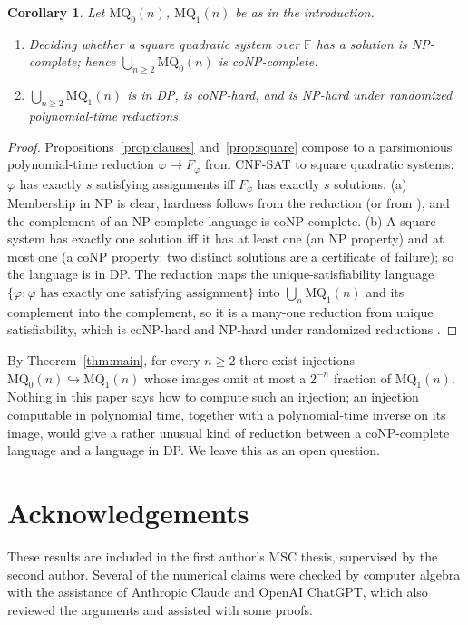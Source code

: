 \documentclass[11pt,a4paper]{article}
\newtheorem{corollary}[theorem]{Corollary}
\theoremstyle{definition}
\newcommand{\MQ}{\mathrm{MQ}}
\newcommand{\FF}{\mathbb{F}}
\begin{document}
\begin{corollary}\label{cor:complexity}
Let $\MQ_0(n)$, $\MQ_1(n)$ be as in the introduction.
\begin{enumerate}[label=\textnormal{(\alph*)}]
\item Deciding whether a square quadratic system over $\FF$ has a solution is NP-complete; hence $\bigcup_{n\ge2}\MQ_0(n)$ is coNP-complete.
\item $\bigcup_{n\ge2}\MQ_1(n)$ is in DP, is coNP-hard, and is NP-hard under randomized polynomial-time reductions.
\end{enumerate}
\end{corollary}

\begin{proof}
Propositions~\ref{prop:clauses} and~\ref{prop:square} compose to a parsimonious polynomial-time reduction $\varphi\mapsto F_\varphi$ from CNF-SAT to square quadratic systems: $\varphi$ has exactly $s$ satisfying assignments iff $F_\varphi$ has exactly $s$ solutions. (a) Membership in NP is clear, hardness follows from the reduction (or from \cite{fraenkelyesha}), and the complement of an NP-complete language is coNP-complete. (b) A square system has exactly one solution iff it has at least one (an NP property) and at most one (a coNP property: two distinct solutions are a certificate of failure); so the language is in DP. The reduction maps the unique-satisfiability language $\{\varphi:\varphi\text{ has exactly one satisfying assignment}\}$ into $\bigcup_n\MQ_1(n)$ and its complement into the complement, so it is a many-one reduction from unique satisfiability, which is coNP-hard \cite{blassgurevich} and NP-hard under randomized reductions \cite{valiantvazirani}.
\end{proof}

By Theorem~\ref{thm:main}, for every $n\ge2$ there exist injections $\MQ_0(n)\hookrightarrow\MQ_1(n)$ whose images omit at most a $2^{-n}$ fraction of $\MQ_1(n)$. Nothing in this paper says how to compute such an injection; an injection computable in polynomial time, together with a polynomial-time inverse on its image, would give a rather unusual kind of reduction between a coNP-complete language and a language in DP. We leave this as an open question.

\section*{Acknowledgements}

These results are included in the first author's MSC thesis, supervised by the
second author. Several of the numerical claims were checked by computer algebra
with the assistance of Anthropic Claude and OpenAI ChatGPT, which also reviewed the
arguments and assisted with some proofs.

\newpage


\end{document}
